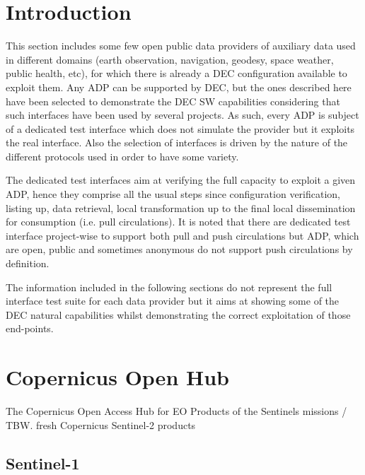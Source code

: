 \documentclass[dec_sum_main.tex]{subfiles}
\begin{document}
\label{Public Data Providers}

\section{Introduction}
 
This section includes some few open public data providers of auxiliary data used in different domains (earth observation, navigation, geodesy, space weather, public health, etc), for which there is already a DEC configuration available to exploit them. Any ADP can be supported by DEC, but the ones described here have been selected to demonstrate the DEC SW capabilities considering that such interfaces have been used by several projects. As such, every ADP is subject of a dedicated test interface which does not simulate the provider but it exploits the real interface. Also the selection of interfaces is driven by the nature of the different protocols used in order to have some variety.\newline

\par
\noindent
The dedicated test interfaces aim at verifying the full capacity to exploit a given ADP, hence they comprise all the usual steps since configuration verification, listing up, data retrieval, local transformation up to the final local dissemination for consumption (i.e. pull circulations). It is noted that there are dedicated test interface project-wise to support both pull and push circulations but ADP, which are open, public and sometimes anonymous do not support push circulations by definition.\newline

\par
\noindent
The information included in the following sections do not represent the full interface test suite for each data provider but it aims at showing some of the DEC natural capabilities whilst demonstrating the correct exploitation of those end-points.

\pagebreak

\section{Copernicus Open Hub}

The Copernicus Open Access Hub for EO Products of the Sentinels missions / TBW.  fresh Copernicus Sentinel-2 products 

\subsection{Sentinel-1}
\end{document}
